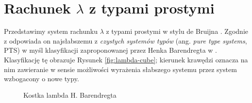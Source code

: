 \section{Rachunek \(\lambda\) z typami prostymi}
Przedstawimy system rachunku \(\lambda\) z typami prostymi w stylu de Bruijna \cite{barendregt_dekkers_statman_2013, Urzyczyn2006}. Zgodnie z \cite[roz. 13E]{Hindley:2008:LCI:1388400} odpowiada on najsłabszemu z \emph{czystych systemów typów}  (ang. \emph{pure type systems}, PTS) w myśl klasyfikacji zaproponowanej przez Henka Barendregta w \cite{barendregt_1991}. Klasyfikację tę obrazuje Rysunek \ref{fig:lambda-cube}; kierunek krawędzi oznacza na nim zawieranie w sensie możliwości wyrażenia słabszego systemu przez system wzbogacony o nowe typy.

\begin{figure}[h]
\centering
{}
\caption{Kostka lambda H. Barendregta}
\end{figure}\label{fig:lambda-cube}


